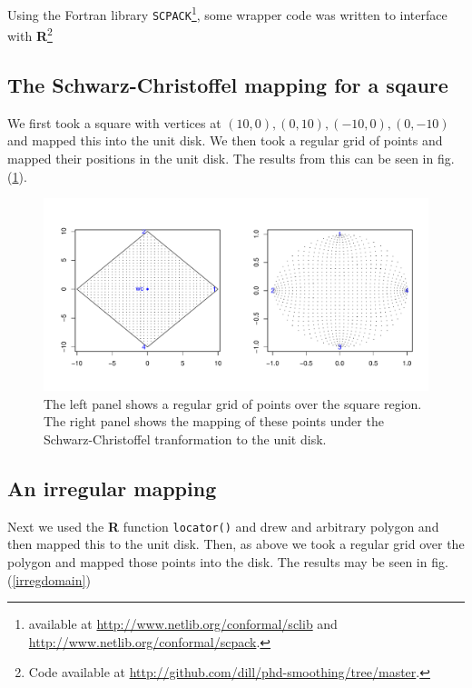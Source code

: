 \documentclass[a4paper,10pt]{amsart}
\newcommand{\sch}{Schwarz-Christoffel }
\begin{document}
Using the Fortran library \texttt{SCPACK}\footnote{available at \url{http://www.netlib.org/conformal/sclib} and \url{http://www.netlib.org/conformal/scpack}.}, some wrapper code was written to interface with \textbf{R}\footnote{Code available at \url{http://github.com/dill/phd-smoothing/tree/master}.}

\subsection{The \sch mapping for a sqaure}
We first took a square with vertices at $(10,0), (0,10),(-10,0),(0,-10)$ and mapped this into the unit disk. We then took a regular grid of points and mapped their positions in the unit disk. The results from this can be seen in fig. (\ref{squaredomain}).

\begin{figure} [bp]
\centering
\includegraphics[scale=0.5]{figs/squaredomain.pdf}
\caption{The left panel shows a regular grid of points over the square region. The right panel shows the mapping of these points under the \sch tranformation to the unit disk.}
\label{squaredomain}
\end{figure}

\subsection{An irregular mapping}
Next we used the \textbf{R} function \texttt{locator()} and drew and arbitrary polygon and then mapped this to the unit disk. Then, as above we took a regular grid over the polygon and mapped those points into the disk. The results may be seen in fig. (\ref{irregdomain})
\end{document}
